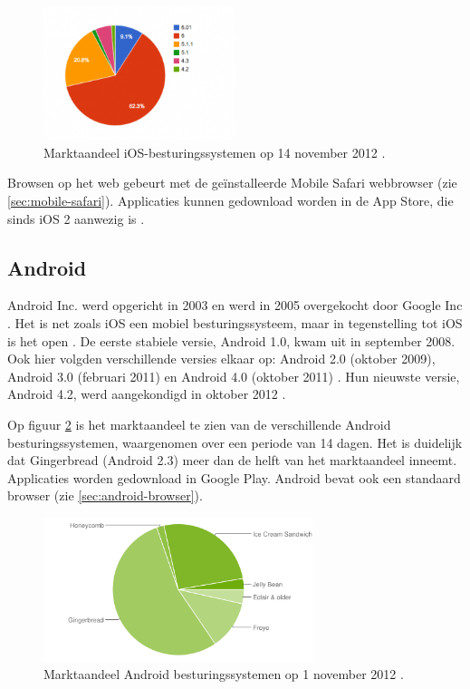 \begin{figure}
  \centering
  \includegraphics[width=0.5\textwidth]{figuren/marketshare-ios-2012-11-14.png}
  \caption{Marktaandeel iOS-besturingssystemen op 14 november 2012 \cite{Sylvain2012}.}
  \label{fig:marketshare-ios}
\end{figure}

Browsen op het web gebeurt met de geïnstalleerde Mobile Safari webbrowser (zie \ref{sec:mobile-safari}). Applicaties kunnen gedownload worden in de App Store, die sinds iOS 2 aanwezig is \cite{Deitel2012}. 

\subsection{Android}
Android Inc. werd opgericht in 2003 en werd in 2005 overgekocht door Google Inc \cite{Satyesh2012}. Het is net zoals iOS een mobiel besturingssysteem, maar in tegenstelling tot iOS is het open \cite{David2011}. De eerste stabiele versie, Android 1.0, kwam uit in september 2008. Ook hier volgden verschillende versies elkaar op: Android 2.0 (oktober 2009), Android 3.0 (februari 2011) en Android 4.0 (oktober 2011) \cite{Satyesh2012}. Hun nieuwste versie, Android 4.2, werd aangekondigd in oktober 2012 \cite{Sawers2012}. 

Op figuur \ref{fig:marketshare-android} is het marktaandeel te zien van de verschillende Android besturingssystemen, waargenomen over een periode van 14 dagen. Het is duidelijk dat Gingerbread (Android 2.3) meer dan de helft van het marktaandeel inneemt.
Applicaties worden gedownload in Google Play. Android bevat ook een standaard browser (zie \ref{sec:android-browser}).

\begin{figure}
  \centering
  \includegraphics[width=0.7\textwidth]{figuren/marketshare-android-2012-11-01.png}
  \caption{Marktaandeel Android besturingssystemen op 1 november 2012 \cite{Android2012}.}
  \label{fig:marketshare-android}
\end{figure}

